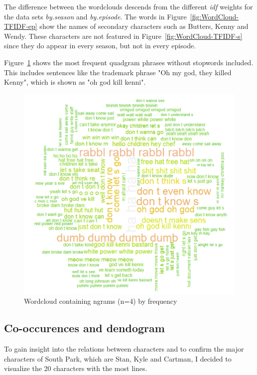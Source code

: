\documentclass[10pt,a4paper]{article}
\begin{document}
		The difference between the wordclouds descends from the different \textit{idf} weights for the data sets \textit{by.season} and \textit{by.episode}. The words in Figure~\ref{fig:WordCloud-TFIDF-ep} show the names of secondary characters such as Butters, Kenny and Wendy. These characters are not featured in Figure~\ref{fig:WordCloud-TFIDF-s} since they do appear in every season, but not in every episode.
		
		Figure~\ref{fig:WordCloud-ngram} shows the most frequent quadgram phrases without stopwords included. This includes sentences like the trademark phrase "Oh my god, they killed Kenny", which is shown as "oh god kill kenni".

	\begin{figure}[h]
	\centering
	\includegraphics[scale=0.6]{images/WordCloud-ngram.png}
	\caption{Wordcloud containing ngrams (n=4) by frequency}
	\label{fig:WordCloud-ngram}
	\end{figure}	
	
	\subsection{Co-occurences and dendogram}
	To gain insight into the relations between characters and to confirm the major characters of South Park, which are Stan, Kyle and Cartman, I decided to visualize the 20 characters with the most lines.
	
\end{document}
